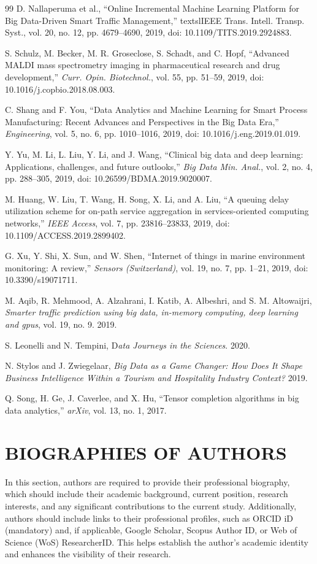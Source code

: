 \documentclass{iaesarticle}
\begin{document}
\begin{thebibliography} {99}
 D. Nallaperuma et al., “Online Incremental Machine Learning Platform for Big Data-Driven Smart Traffic Management,” textsl{IEEE Trans. Intell. Transp. Syst.}, vol. 20, no. 12, pp. 4679–4690, 2019, doi: 10.1109/TITS.2019.2924883.

 S. Schulz, M. Becker, M. R. Groseclose, S. Schadt, and C. Hopf, “Advanced MALDI mass spectrometry imaging in pharmaceutical research and drug development,” \textsl{Curr. Opin. Biotechnol.}, vol. 55, pp. 51–59, 2019, doi: 10.1016/j.copbio.2018.08.003.

 C. Shang and F. You, “Data Analytics and Machine Learning for Smart Process Manufacturing: Recent Advances and Perspectives in the Big Data Era,” \textsl{Engineering}, vol. 5, no. 6, pp. 1010–1016, 2019, doi: 10.1016/j.eng.2019.01.019.

 Y. Yu, M. Li, L. Liu, Y. Li, and J. Wang, “Clinical big data and deep learning: Applications, challenges, and future outlooks,” \textsl{Big Data Min. Anal.}, vol. 2, no. 4, pp. 288–305, 2019, doi: 10.26599/BDMA.2019.9020007.

 M. Huang, W. Liu, T. Wang, H. Song, X. Li, and A. Liu, “A queuing delay utilization scheme for on-path service aggregation in services-oriented computing networks,” \textsl{IEEE Access}, vol. 7, pp. 23816–23833, 2019, doi: 10.1109/ACCESS.2019.2899402.

 G. Xu, Y. Shi, X. Sun, and W. Shen, “Internet of things in marine environment monitoring: A review,” \textsl{Sensors (Switzerland)}, vol. 19, no. 7, pp. 1–21, 2019, doi: 10.3390/s19071711.

 M. Aqib, R. Mehmood, A. Alzahrani, I. Katib, A. Albeshri, and S. M. Altowaijri, \textsl{Smarter traffic prediction using big data, in-memory computing, deep learning and gpus}, vol. 19, no. 9. 2019.

 S. Leonelli and N. Tempini, D\textsl{ata Journeys in the Sciences}. 2020.

 N. Stylos and J. Zwiegelaar, \textsl{Big Data as a Game Changer: How Does It Shape Business Intelligence Within a Tourism and Hospitality Industry Context?} 2019.

 Q. Song, H. Ge, J. Caverlee, and X. Hu, “Tensor completion algorithms in big data analytics,” \textsl{arXiv}, vol. 13, no. 1, 2017.

\end{thebibliography}


\section*{BIOGRAPHIES OF AUTHORS} 
\normalsize 
In this section, authors are required to provide their professional biography, which should include their academic background, current position, research interests, and any significant contributions to the current study. Additionally, authors should include links to their professional profiles, such as ORCID iD (mandatory) and, if applicable, Google Scholar, Scopus Author ID, or Web of Science (WoS) ResearcherID. This helps establish the author’s academic identity and enhances the visibility of their research.
\end{document}
